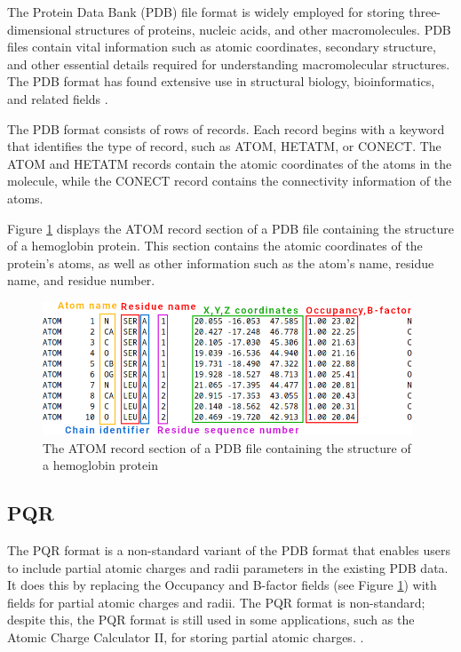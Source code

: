 \documentclass[
  digital,     %
  oneside,     %
  nosansbold,  %
  nocolorbold, %
  lof,         %
  lot,         %
]{fithesis4}
\begin{document}
The Protein Data Bank (PDB) file format is widely employed for storing three-dimensional structures of proteins, nucleic acids, and other macromolecules. PDB files contain vital information such as atomic coordinates, secondary structure, and other essential details required for understanding macromolecular structures. The PDB format has found extensive use in structural biology, bioinformatics, and related fields \cite{wikipedia_pdbfile}.

The PDB format consists of rows of records. Each record begins with a keyword that identifies the type of record, such as ATOM, HETATM, or CONECT. The ATOM and HETATM records contain the atomic coordinates of the atoms in the molecule, while the CONECT record contains the connectivity information of the atoms. \cite{wikipedia_pdbfile}

Figure \ref{fig:pdb} displays the ATOM record section of a PDB file containing the structure of a hemoglobin protein. This section contains the atomic coordinates of the protein's atoms, as well as other information such as the atom's name, residue name, and residue number. \cite{wikipedia_pdbfile}

\begin{figure}[htbp]
  \begin{center}
    \includegraphics[width=11cm]{figures/pdb_format.png}
  \end{center}
  \caption{The ATOM record section of a PDB file containing the structure of a hemoglobin protein}
  \label{fig:pdb}
\end{figure}

\subsection{PQR}
\label{subsection:pqr}

The PQR format is a non-standard variant of the PDB format that enables users to include partial atomic charges and radii parameters in the existing PDB data. It does this by replacing the Occupancy and B-factor fields (see Figure \ref{fig:pdb}) with fields for partial atomic charges and radii. \cite{pqrfile,apbs_pqrfile} The PQR format is non-standard; despite this, the PQR format is still used in some applications, such as the Atomic Charge Calculator II, for storing partial atomic charges. \cite{racek2020acc2}.
\end{document}
